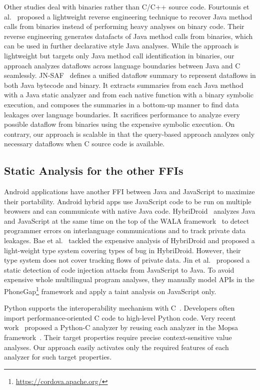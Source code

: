 Other studies deal with binaries rather than C/C++ source code.  Fourtounis et
al.~\cite{scanning} proposed a lightweight reverse engineering technique to
recover Java method calls from binaries instead of performing heavy analyses on
binary code.  Their reverse engineering generates datafacts of Java method
calls from binaries, which can be used in further declarative style Java
analyses. While the approach is lightweight but targets only Java method call
identification in binaries, our approach analyzes dataflows across language
boundaries between Java and C seamlessly.  JN-SAF~\cite{JN-SAF} defines a
unified dataflow summary to represent dataflows in both Java bytecode and
binary.  It extracts summaries from each Java method with a Java static
analyzer and from each native function with a binary symbolic execution, and
composes the summaries in a bottom-up manner to find data leakages over
language boundaries.  It sacrifices performance to analyze every possible
dataflow from binaries using the expensive symbolic execution. On contrary, our
approach is scalable in that the query-based approach analyzes only necessary
dataflows when C source code is available.


\subsection{Static Analysis for the other FFIs}
Android applications have another FFI between Java and JavaScript to maximize
their portability.  Android hybrid apps use JavaScript code to be run on
multiple browsers and can communicate with native Java code.
HybriDroid~\cite{hybridroid} analyzes Java and JavaScript at the same time on
the top of the WALA framework~\cite{WALA} to detect programmer errors on interlanguage
communications and to track private data leakages.  Bae et al.~\cite{BaeICSE19}
tackled the expensive analysis of HybriDroid and proposed a light-weight type
system covering types of bug in HybriDroid.  However, their type system does not
cover tracking flows of private data.  Jin et al.~\cite{jin2014code} proposed a
static detection of code injection attacks from JavaScript to Java.  To avoid
expensive whole multilingual program analyses, they manually model APIs in the
PhoneGap\footnote{\url{https://cordova.apache.org/}} framework and apply a taint
analysis on JavaScript only.

Python supports the interoperability mechanism with C~\cite{PythonC}.
Developers often import performance-oriented C code to high-level Python code.
Very recent work~\cite{sas2021} proposed a Python-C analyzer by reusing each
analyzer in the Mopsa framework~\cite{Mopsa}.  Their target properties require
precise context-sensitive value analyses.  Our approach easily activates only
the required features of each analyzer for such target properties.

